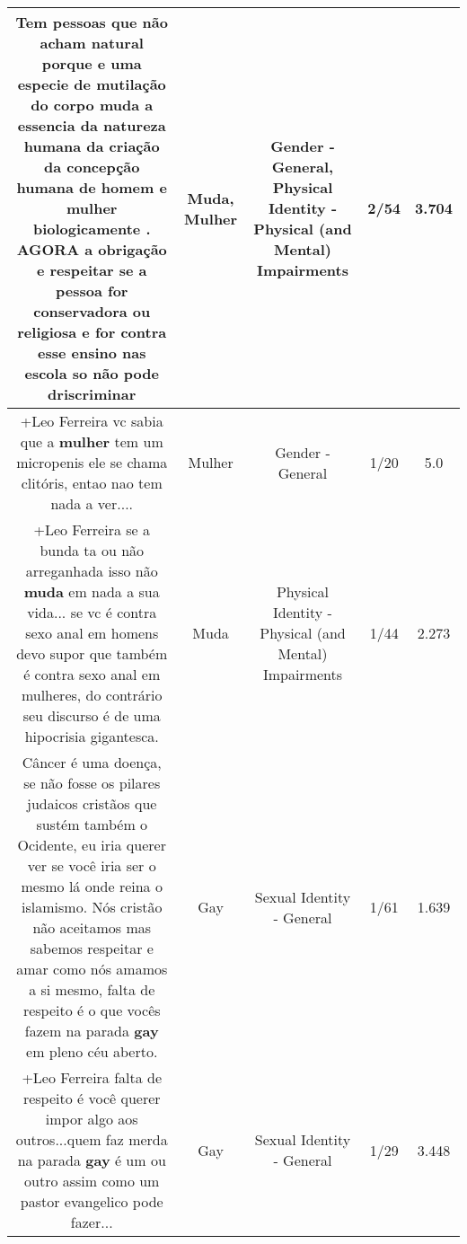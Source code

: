 \documentclass[11pt]{article}
\newlength\mylength
\begin{document}
\begin{center}
\begin{longtable}{|C{.65\mylength}|C{.30\mylength}|C{.12\mylength}|C{.12\mylength}|C{.12\mylength}|}
  \small Tem  pessoas que não acham natural porque e uma especie de mutilação do corpo \textbf{muda}  a essencia da natureza humana da criação da concepção humana de homem e \textbf{mulher} biologicamente .  AGORA a obrigação e respeitar se a pessoa for conservadora ou religiosa e for  contra esse ensino nas escola so não pode driscriminar\normalsize   & Muda, Mulher & Gender - General, Physical Identity - Physical (and Mental) Impairments & 2/54 & 3.704 \\  \hline
  \small +Leo Ferreira vc sabia que a \textbf{mulher} tem um micropenis ele se chama clitóris, entao nao tem nada a ver....\normalsize   & Mulher & Gender - General & 1/20 & 5.0 \\  \hline
  \small +Leo Ferreira se a bunda ta ou não arreganhada isso não \textbf{muda} em nada a sua vida... se vc é contra sexo anal em homens devo supor que também é contra sexo anal em mulheres, do contrário seu discurso é de uma hipocrisia gigantesca.\normalsize   & Muda & Physical Identity - Physical (and Mental) Impairments & 1/44 & 2.273 \\  \hline
  \small Câncer é uma doença, se não fosse os pilares judaicos cristãos que sustém também o Ocidente, eu iria querer ver se você iria ser o mesmo lá onde reina o islamismo. Nós cristão não aceitamos mas sabemos respeitar e amar como nós amamos a si mesmo, falta de respeito é o que vocês fazem na parada \textbf{gay} em pleno céu aberto.\normalsize   & Gay & Sexual Identity - General & 1/61 & 1.639 \\  \hline
  \small +Leo Ferreira falta de respeito é você querer impor algo aos outros...quem faz merda na parada \textbf{gay} é um ou outro assim como um pastor evangelico pode fazer...\normalsize   & Gay & Sexual Identity - General & 1/29 & 3.448 \\  \hline

\end{longtable}
\end{center}
\end{document}
